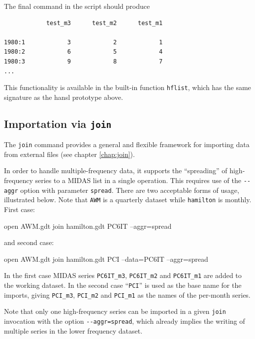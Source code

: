 The final command in the script should produce

{
\small
\begin{verbatim}
            test_m3      test_m2      test_m1

1980:1            3            2            1
1980:2            6            5            4
1980:3            9            8            7
...
\end{verbatim}
}

This functionality is available in the built-in function
\texttt{hflist}, which has the same signature as the hansl prototype
above.

\subsection*{Importation via \texttt{join}}

The \texttt{join} command provides a general and flexible framework
for importing data from external files (see chapter \ref{chap:join}). 

In order to handle multiple-frequency data, it supports the
``spreading'' of high-frequency series to a MIDAS list in a single
operation. This requires use of the \verb|--aggr| option with
parameter \texttt{spread}. There are two acceptable forms of usage,
illustrated below. Note that \texttt{AWM} is a quarterly dataset while
\texttt{hamilton} is monthly. First case:
%
\begin{code}
open AWM.gdt
join hamilton.gdt PC6IT --aggr=spread
\end{code}
and second case:
\begin{code}
open AWM.gdt
join hamilton.gdt PCI --data=PC6IT --aggr=spread
\end{code}

In the first case MIDAS series \texttt{PC6IT\_m3}, \texttt{PC6IT\_m2}
and \texttt{PC6IT\_m1} are added to the working dataset. In the second
case ``\texttt{PCI}'' is used as the base name for the imports,
giving \texttt{PCI\_m3}, \texttt{PCI\_m2} and \texttt{PCI\_m1}
as the names of the per-month series.

Note that only one high-frequency series can be imported in a given
\texttt{join} invocation with the option \verb|--aggr=spread|, which
already implies the writing of multiple series in the lower frequency
dataset.

